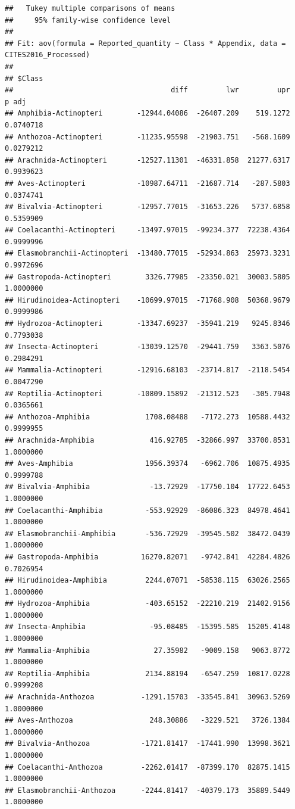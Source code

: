 \documentclass[
  12pt,
]{article}
\begin{document}
\begin{verbatim}
##   Tukey multiple comparisons of means
##     95% family-wise confidence level
## 
## Fit: aov(formula = Reported_quantity ~ Class * Appendix, data = CITES2016_Processed)
## 
## $Class
##                                     diff         lwr         upr     p adj
## Amphibia-Actinopteri        -12944.04086  -26407.209    519.1272 0.0740718
## Anthozoa-Actinopteri        -11235.95598  -21903.751   -568.1609 0.0279212
## Arachnida-Actinopteri       -12527.11301  -46331.858  21277.6317 0.9939623
## Aves-Actinopteri            -10987.64711  -21687.714   -287.5803 0.0374741
## Bivalvia-Actinopteri        -12957.77015  -31653.226   5737.6858 0.5359909
## Coelacanthi-Actinopteri     -13497.97015  -99234.377  72238.4364 0.9999996
## Elasmobranchii-Actinopteri  -13480.77015  -52934.863  25973.3231 0.9972696
## Gastropoda-Actinopteri        3326.77985  -23350.021  30003.5805 1.0000000
## Hirudinoidea-Actinopteri    -10699.97015  -71768.908  50368.9679 0.9999986
## Hydrozoa-Actinopteri        -13347.69237  -35941.219   9245.8346 0.7793038
## Insecta-Actinopteri         -13039.12570  -29441.759   3363.5076 0.2984291
## Mammalia-Actinopteri        -12916.68103  -23714.817  -2118.5454 0.0047290
## Reptilia-Actinopteri        -10809.15892  -21312.523   -305.7948 0.0365661
## Anthozoa-Amphibia             1708.08488   -7172.273  10588.4432 0.9999955
## Arachnida-Amphibia             416.92785  -32866.997  33700.8531 1.0000000
## Aves-Amphibia                 1956.39374   -6962.706  10875.4935 0.9999788
## Bivalvia-Amphibia              -13.72929  -17750.104  17722.6453 1.0000000
## Coelacanthi-Amphibia          -553.92929  -86086.323  84978.4641 1.0000000
## Elasmobranchii-Amphibia       -536.72929  -39545.502  38472.0439 1.0000000
## Gastropoda-Amphibia          16270.82071   -9742.841  42284.4826 0.7026954
## Hirudinoidea-Amphibia         2244.07071  -58538.115  63026.2565 1.0000000
## Hydrozoa-Amphibia             -403.65152  -22210.219  21402.9156 1.0000000
## Insecta-Amphibia               -95.08485  -15395.585  15205.4148 1.0000000
## Mammalia-Amphibia               27.35982   -9009.158   9063.8772 1.0000000
## Reptilia-Amphibia             2134.88194   -6547.259  10817.0228 0.9999208
## Arachnida-Anthozoa           -1291.15703  -33545.841  30963.5269 1.0000000
## Aves-Anthozoa                  248.30886   -3229.521   3726.1384 1.0000000
## Bivalvia-Anthozoa            -1721.81417  -17441.990  13998.3621 1.0000000
## Coelacanthi-Anthozoa         -2262.01417  -87399.170  82875.1415 1.0000000
## Elasmobranchii-Anthozoa      -2244.81417  -40379.173  35889.5449 1.0000000

\end{verbatim}
\end{document}
